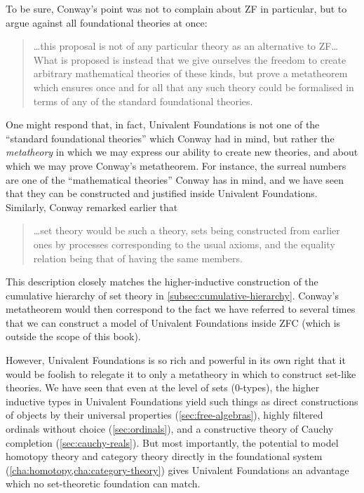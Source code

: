 To be sure, Conway's point was not to complain about ZF in particular, but to argue against all foundational theories at once:
\begin{quote}\footnotesize
  \dots this proposal is not of any particular theory as an alternative to ZF\dots
  What is proposed is instead that we give ourselves the freedom to create arbitrary mathematical theories of these kinds, but prove a metatheorem which ensures once and for all that any such theory could be formalised in terms of any of the standard foundational theories.
\end{quote}
One might respond that, in fact, Univalent Foundations is not one of the ``standard foundational theories'' which Conway had in mind, but rather the \emph{metatheory} in which we may express our ability to create new theories, and about which we may prove Conway's metatheorem.
For instance, the surreal numbers are one of the ``mathematical theories'' Conway has in mind, and we have seen that they can be constructed and justified inside Univalent Foundations.
Similarly, Conway remarked earlier that
\begin{quote}\footnotesize
  \dots set theory would be such a theory, sets being constructed from earlier ones by processes corresponding to the usual axioms, and the equality relation being that of having the same members.
\end{quote}
This description closely matches the higher-inductive construction of the cumulative hierarchy of set theory in \autoref{subsec:cumulative-hierarchy}.
Conway's metatheorem would then correspond to the fact we have referred to several times that we can construct a model of Univalent Foundations inside ZFC (which is outside the scope of this book).

However, Univalent Foundations is so rich and powerful in its own right that it would be foolish to relegate it to only a metatheory in which to construct set-like theories.
We have seen that even at the level of sets (0-types), the higher inductive types in Univalent Foundations yield such things as direct constructions of objects by their universal properties (\autoref{sec:free-algebras}), highly filtered ordinals without choice (\autoref{sec:ordinals}), and a constructive theory of Cauchy completion (\autoref{sec:cauchy-reals}).
But most importantly, the potential to model homotopy theory and category theory directly in the foundational system (\autoref{cha:homotopy,cha:category-theory}) gives Univalent Foundations an advantage which no set-theoretic foundation can match.


